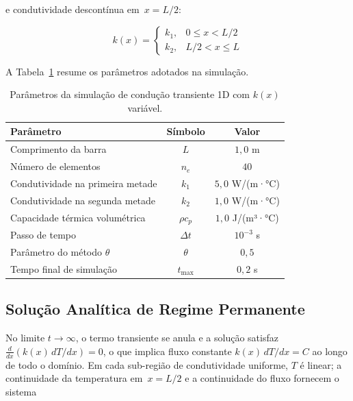 \noindent e condutividade descontínua em~$x = L/2$:

\begin{equation}
    k(x) = \begin{cases} k_1, & 0 \leq x < L/2 \\ k_2, & L/2 < x \leq L \end{cases}
    \label{eq:val_calor_transiente_k}
\end{equation}

A Tabela~\ref{tab:val_calor_transiente_params} resume os parâmetros adotados na simulação.

\begin{table}[htbp]
    \centering
    \caption{Parâmetros da simulação de condução transiente 1D com $k(x)$ variável.}
    \label{tab:val_calor_transiente_params}
    \begin{tabular}{lcc}
        \hline
        \textbf{Parâmetro} & \textbf{Símbolo} & \textbf{Valor} \\
        \hline
        Comprimento da barra           & $L$          & $1{,}0$ m            \\
        Número de elementos            & $n_e$        & $40$                 \\
        Condutividade na primeira metade & $k_1$      & $5{,}0$ W/(m·°C)     \\
        Condutividade na segunda metade  & $k_2$      & $1{,}0$ W/(m·°C)     \\
        Capacidade térmica volumétrica & $\rho c_p$   & $1{,}0$ J/(m³·°C)    \\
        Passo de tempo                 & $\Delta t$   & $10^{-3}$ s          \\
        Parâmetro do método $\theta$   & $\theta$     & $0{,}5$              \\
        Tempo final de simulação       & $t_{\max}$   & $0{,}2$ s            \\
        \hline
    \end{tabular}
\end{table}

\subsection{Solução Analítica de Regime Permanente}

No limite $t \to \infty$, o termo transiente se anula e a solução satisfaz $\frac{d}{dx}(k(x) \, dT/dx) = 0$, o que implica fluxo constante $k(x) \, dT/dx = C$ ao longo de todo o domínio. Em cada sub-região de condutividade uniforme, $T$ é linear; a continuidade da temperatura em~$x = L/2$ e a continuidade do fluxo fornecem o sistema

